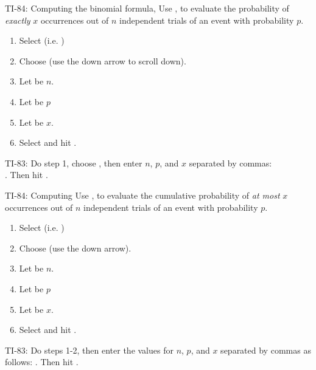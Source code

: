 \begin{onebox}{ TI-84: Computing the binomial formula, }
\label{binomialformula}
Use  ,  to evaluate the probability of \emph{exactly} $x$ occurrences out of $n$ independent trials of an event with probability $p$. 
\begin{enumerate}
\setlength{\itemsep}{0mm}
\item Select   (i.e. )
\item Choose  (use the down arrow to scroll down).
\item Let  be $n$.
\item Let  be $p$
\item Let  be $x$.
\item Select  and hit .\vspace{-1.5mm}
\end{enumerate}
TI-83: Do step 1, choose , then enter $n$, $p$, and $x$ separated by commas:\\
	. Then hit . 
\end{onebox}

\begin{onebox}{ TI-84: Computing  }
\label{binomialcumulative}
Use  ,  to evaluate the cumulative probability of \emph{at most} $x$ occurrences out of $n$ independent trials of an event with probability $p$. 
\begin{enumerate}
\setlength{\itemsep}{0mm}
\item Select   (i.e. )
\item Choose  (use the down arrow).
\item Let  be $n$.
\item Let  be $p$
\item Let  be $x$.
\item Select  and hit .\vspace{-1.5mm}
\end{enumerate}
TI-83: Do steps 1-2, then enter the values for $n$, $p$, and $x$ separated by commas as follows: . Then hit .\end{onebox}


